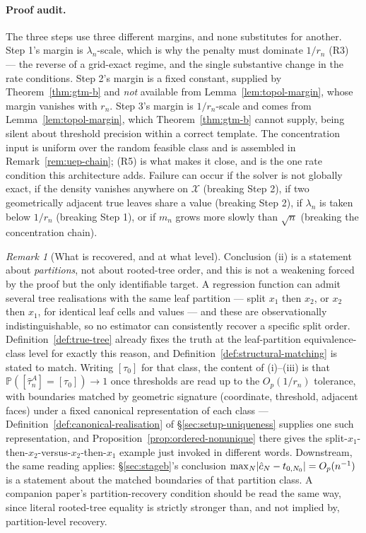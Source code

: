 \documentclass[11pt]{article}
\theoremstyle{plain}
\theoremstyle{definition}
\theoremstyle{remark}
\newtheorem{remark}[theorem]{Remark}
\newcommand{\PP}{\mathbb{P}}
\newcommand{\cX}{\mathcal{X}}
\DeclarePairedDelimiter{\abs}{\lvert}{\rvert}
\begin{document}
\paragraph{Proof audit.}
The three steps use three different margins, and none substitutes for
another. Step 1's margin is \(\lambda_n\)-scale, which is why the penalty must
dominate \(1/r_n\) (R3) --- the reverse of a grid-exact regime, and the single
substantive change in the rate conditions. Step 2's margin is a fixed
constant, supplied by Theorem~\ref{thm:gtm-b} and \emph{not} available from
Lemma~\ref{lem:topol-margin}, whose margin vanishes with \(r_n\). Step 3's
margin is \(1/r_n\)-scale and comes from Lemma~\ref{lem:topol-margin}, which
Theorem~\ref{thm:gtm-b} cannot supply, being silent about threshold precision
within a correct template. The concentration input is uniform over the random
feasible class and is assembled in Remark~\ref{rem:uep-chain}; (R5) is what
makes it close, and is the one rate condition this architecture adds. Failure
can occur if the solver is not globally exact, if the density vanishes
anywhere on \(\cX\) (breaking Step 2), if two geometrically adjacent true
leaves share a value (breaking Step 2), if \(\lambda_n\) is taken below
\(1/r_n\) (breaking Step 1), or if \(m_n\) grows more slowly than \(\sqrt n\)
(breaking the concentration chain).

\begin{remark}[What is recovered, and at what level]\label{rem:identification}
Conclusion (ii) is a statement about \emph{partitions}, not about rooted-tree
order, and this is not a weakening forced by the proof but the only
identifiable target. A regression function can admit several tree
realisations with the same leaf partition --- split \(x_1\) then \(x_2\), or
\(x_2\) then \(x_1\), for identical leaf cells and values --- and these are
observationally indistinguishable, so no estimator can consistently recover a
specific split order. Definition~\ref{def:true-tree} already fixes the truth
at the leaf-partition equivalence-class level for exactly this reason, and
Definition~\ref{def:structural-matching} is stated to match. Writing
\([\tau_0]\) for that class, the content of (i)--(iii) is that
\(\PP([\hat\tau^A_n]=[\tau_0])\to1\) once thresholds are read up to the
\(O_p(1/r_n)\) tolerance, with boundaries matched by geometric signature
(coordinate, threshold, adjacent faces) under a fixed canonical
representation of each class ---
Definition~\ref{def:canonical-realisation} of \S\ref{sec:setup-uniqueness}
supplies one such representation, and
Proposition~\ref{prop:ordered-nonunique} there gives the split-$x_1$-then-$x_2$-versus-$x_2$-then-$x_1$
example just invoked in different words. Downstream, the same reading applies:
\S\ref{sec:stageb}'s conclusion
\(\max_N\abs{\hat c_N-t_{0,N_0}}=O_p(n^{-1})\) is a statement about the
matched boundaries of that partition class. A companion paper's
partition-recovery condition should be read the same way, since literal
rooted-tree equality is strictly stronger than, and not implied by,
partition-level recovery.
\end{remark}
\end{document}
